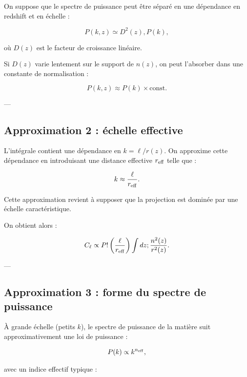 \documentclass[a4paper,11pt]{article}
\begin{document}
On suppose que le spectre de puissance peut être séparé en une dépendance en redshift et en échelle :

\begin{equation}
P(k,z) \simeq D^2(z), P(k),
\end{equation}

où $D(z)$ est le facteur de croissance linéaire.

Si $D(z)$ varie lentement sur le support de $n(z)$, on peut l'absorber dans une constante de normalisation :

\begin{equation}
P(k,z) \approx P(k) \times \text{const}.
\end{equation}

---

\subsection{Approximation 2 : échelle effective}

L'intégrale contient une dépendance en $k = \ell / r(z)$.
On approxime cette dépendance en introduisant une distance effective $r_{\rm eff}$ telle que :

\begin{equation}
k \approx \frac{\ell}{r_{\rm eff}}.
\end{equation}

Cette approximation revient à supposer que la projection est dominée par une échelle caractéristique.

On obtient alors :

\begin{equation}
C_\ell \propto P!\left(\frac{\ell}{r_{\rm eff}}\right)
\int dz ; \frac{n^2(z)}{r^2(z)}.
\end{equation}

---

\subsection{Approximation 3 : forme du spectre de puissance}

À grande échelle (petits $k$), le spectre de puissance de la matière suit approximativement une loi de puissance :

\begin{equation}
P(k) \propto k^{n_{\rm eff}},
\end{equation}

avec un indice effectif typique :
\end{document}
